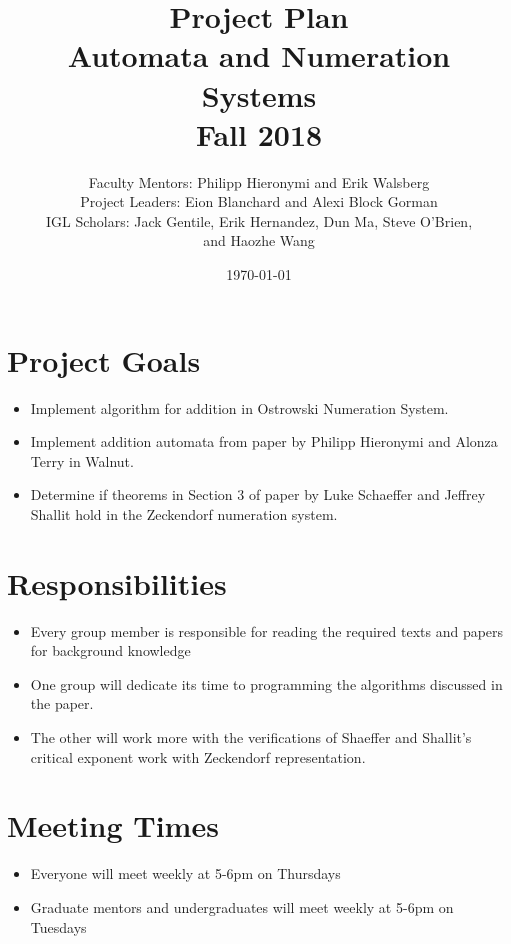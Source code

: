\documentclass[12pt]{article}
\begin{document}
\title{Project Plan\\ {Automata and Numeration Systems} \\Fall 2018}
\author{Faculty Mentors: {Philipp Hieronymi and Erik Walsberg} \\
	Project Leaders: {Eion Blanchard and Alexi Block Gorman}\\
	IGL Scholars: {Jack Gentile, Erik Hernandez, Dun Ma, Steve O'Brien, \\ and Haozhe Wang}}
\date{\today}
\maketitle
\section{Project Goals}
\begin{itemize} 
\item Implement algorithm for addition in Ostrowski Numeration System.
\item Implement addition automata from paper by Philipp Hieronymi and Alonza Terry in Walnut.
\item Determine if theorems in Section 3 of paper by Luke Schaeffer and Jeffrey Shallit hold in the Zeckendorf numeration system. 
\end{itemize}

\section{Responsibilities}
\begin{itemize}
\item Every group member is responsible for reading the required texts and papers for background knowledge
\item One group will dedicate its time to programming the algorithms discussed in the paper.
\item The other will work more with the verifications of Shaeffer and Shallit's critical exponent work with Zeckendorf representation.

\end{itemize}

\section{Meeting Times}
\begin{itemize}
	\item Everyone will meet weekly at 5-6pm on Thursdays
	\item Graduate mentors and undergraduates will meet weekly at 5-6pm on Tuesdays
\end{itemize}
\end{document}
